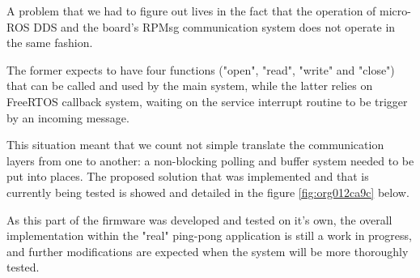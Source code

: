 \documentclass[10pt]{article}
\begin{document}
A problem that we had to figure out lives in the fact that the operation of micro-ROS DDS
and the board's RPMsg communication system does not operate in the same fashion.

The former expects to have four functions ("open", "read", "write" and "close") that can
be called and used by the main system, while the latter relies on FreeRTOS callback
system, waiting on the service interrupt routine to be trigger by an incoming message.

This situation meant that we count not simple translate the communication layers from one
to another: a non-blocking polling and buffer system needed to be put into places.
The proposed solution that was implemented and that is currently being tested
is showed and detailed in the figure \ref{fig:org012ca9c} below.

As this part of the firmware was developed and tested on it's own, the overall
implementation within the "real" ping-pong application is still a work in progress,
and further modifications are expected when the system will be more thoroughly tested.
\end{document}
